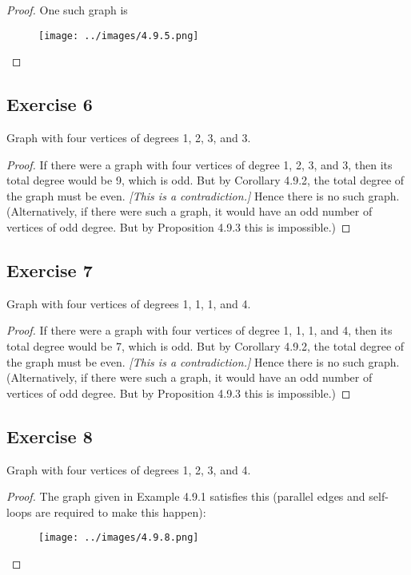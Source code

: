 \documentclass[14pt]{extarticle}
\begin{document}
\begin{proof}
    One such graph is
    \begin{figure}[ht!]
        \centering
        \texttt{[image: ../images/4.9.5.png]}
    \end{figure}
\end{proof}

\subsection{Exercise 6}
Graph with four vertices of degrees 1, 2, 3, and 3.

\begin{proof}
    If there were a graph with four vertices of degree 1, 2, 3, and 3, then its total degree would be 9, which is odd. But by Corollary 4.9.2, the total degree of the graph must be even. {\it [This is a contradiction.]} Hence there is no such graph. (Alternatively, if there were such a graph, it would have an odd number of vertices of odd degree. But by Proposition 4.9.3 this is impossible.)
\end{proof}

\subsection{Exercise 7}
Graph with four vertices of degrees 1, 1, 1, and 4.

\begin{proof}
    If there were a graph with four vertices of degree 1, 1, 1, and 4, then its total degree would be 7, which is odd. But by Corollary 4.9.2, the total degree of the graph must be even. {\it [This is a contradiction.]} Hence there is no such graph. (Alternatively, if there were such a graph, it would have an odd number of vertices of odd degree. But by Proposition 4.9.3 this is impossible.)
\end{proof}

\subsection{Exercise 8}
Graph with four vertices of degrees 1, 2, 3, and 4.

\begin{proof}
    The graph given in Example 4.9.1 satisfies this (parallel edges and self-loops are required to make this happen):
    \begin{figure}[ht!]
        \centering
        \texttt{[image: ../images/4.9.8.png]}
    \end{figure}
\end{proof}
\end{document}
